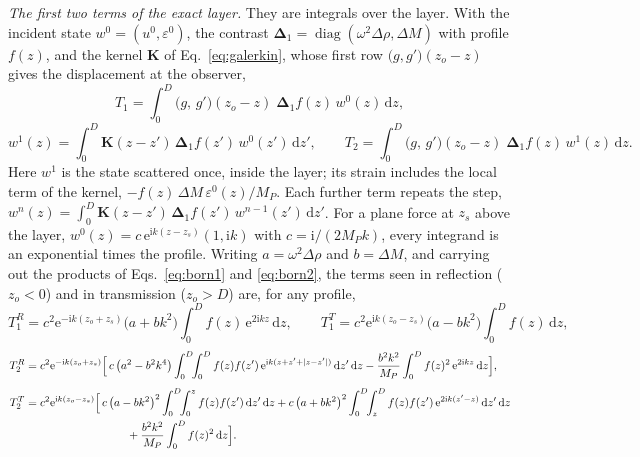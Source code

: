 \documentclass[11pt,a4paper]{article}
\newcommand{\bK}{\mathbf{K}}
\newcommand{\bD}{\boldsymbol{\Delta}}
\newcommand{\dd}{\mathrm{d}}
\begin{document}
\emph{The first two terms of the exact layer.} They are integrals over the layer. With the incident
state $w^0=(u^0,\varepsilon^0)$, the contrast $\bD_1=\operatorname{diag}(\omega^2\Delta\rho,\Delta M)$
with profile $f(z)$, and the kernel $\bK$ of Eq.~\eqref{eq:galerkin}, whose first row
$\bigl(g,g'\bigr)(z_o-z)$ gives the displacement at the observer,
\begin{equation}\label{eq:born1}
  T_1=\int_0^D\bigl(g,\,g'\bigr)(z_o-z)\;\bD_1f(z)\,w^0(z)\,\dd z ,
\end{equation}
\begin{equation}\label{eq:born2}
  w^1(z)=\int_0^D\bK(z-z')\,\bD_1f(z')\,w^0(z')\,\dd z',\qquad
  T_2=\int_0^D\bigl(g,\,g'\bigr)(z_o-z)\;\bD_1f(z)\,w^1(z)\,\dd z .
\end{equation}
Here $w^1$ is the state scattered once, inside the layer; its strain includes the local term of the
kernel, $-f(z)\,\Delta M\,\varepsilon^0(z)/M_P$. Each further term repeats the step,
$w^n(z)=\int_0^D\bK(z-z')\,\bD_1f(z')\,w^{n-1}(z')\,\dd z'$. For a plane force at $z_s$ above the layer,
$w^0(z)=c\,\mathrm{e}^{\mathrm{i}k(z-z_s)}(1,\mathrm{i}k)$ with $c=\mathrm{i}/(2M_Pk)$, every integrand
is an exponential times the profile. Writing $a=\omega^2\Delta\rho$ and $b=\Delta M$, and carrying out
the products of Eqs.~\eqref{eq:born1} and \eqref{eq:born2}, the terms seen in reflection ($z_o<0$) and
in transmission ($z_o>D$) are, for any profile,
\begin{equation}\label{eq:born1explicit}
  T_1^{R}=c^2\mathrm{e}^{-\mathrm{i}k(z_o+z_s)}\bigl(a+bk^2\bigr)\int_0^Df(z)\,\mathrm{e}^{2\mathrm{i}kz}\,\dd z,
  \qquad
  T_1^{T}=c^2\mathrm{e}^{\mathrm{i}k(z_o-z_s)}\bigl(a-bk^2\bigr)\int_0^Df(z)\,\dd z,
\end{equation}
\begin{equation}\label{eq:born2explicit}
\begin{aligned}
  T_2^{R}&=c^2\mathrm{e}^{-\mathrm{i}k(z_o+z_s)}\Bigl[\,c\,\bigl(a^2-b^2k^4\bigr)
     \int_0^D\!\!\int_0^Df(z)f(z')\,\mathrm{e}^{\mathrm{i}k(z+z'+|z-z'|)}\,\dd z'\,\dd z
     -\frac{b^2k^2}{M_P}\int_0^Df(z)^2\,\mathrm{e}^{2\mathrm{i}kz}\,\dd z\Bigr],\\[4pt]
  T_2^{T}&=c^2\mathrm{e}^{\mathrm{i}k(z_o-z_s)}\Bigl[\,c\,\bigl(a-bk^2\bigr)^2
     \int_0^D\!\!\int_0^{z}f(z)f(z')\,\dd z'\,\dd z
     +c\,\bigl(a+bk^2\bigr)^2\int_0^D\!\!\int_z^{D}f(z)f(z')\,\mathrm{e}^{2\mathrm{i}k(z'-z)}\,\dd z'\,\dd z\\
     &\hspace{9em}+\frac{b^2k^2}{M_P}\int_0^Df(z)^2\,\dd z\Bigr].
\end{aligned}
\end{equation}
\end{document}
